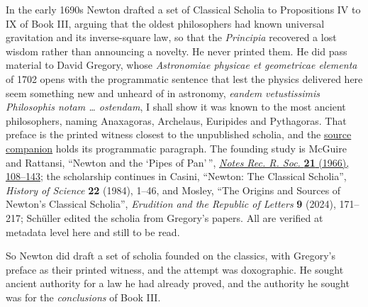 \documentclass[11pt,a4paper]{article}
\begin{document}
In the early 1690s Newton drafted a set of Classical Scholia to
Propositions IV to IX of Book III, arguing that the oldest philosophers
had known universal gravitation and its inverse-square law, so that the
\emph{Principia} recovered a lost wisdom rather than announcing a
novelty. He never printed them. He did pass material to David Gregory,
whose \emph{Astronomiae physicae et geometricae elementa} of 1702 opens
with the programmatic sentence that lest the physics delivered here seem
something new and unheard of in astronomy, \emph{eandem vetustissimis
Philosophis notam \ldots{} ostendam}, I shall show it was known to the
most ancient philosophers, naming Anaxagoras, Archelaus, Euripides and
Pythagoras. That preface is the printed witness closest to the
unpublished scholia, and the
\href{../docs/classics/Gregory_AstronomiaeElementa_Praefatio_1702_OCR.md}{source
companion} holds its programmatic paragraph. The founding study is
McGuire and Rattansi, ``Newton and the `Pipes of Pan'\,'',
\href{https://doi.org/10.1098/rsnr.1966.0014}{\emph{Notes Rec. R. Soc.}
\textbf{21} (1966), 108--143}; the scholarship continues in Casini,
``Newton: The Classical Scholia'', \emph{History of Science} \textbf{22}
(1984), 1--46, and Mosley, ``The Origins and Sources of Newton's
Classical Scholia'', \emph{Erudition and the Republic of Letters}
\textbf{9} (2024), 171--217; Schüller edited the scholia from Gregory's
papers. All are verified at metadata level here and still to be read.

So Newton did draft a set of scholia founded on the classics, with
Gregory's preface as their printed witness, and the attempt was
doxographic. He sought ancient authority for a law he had already
proved, and the authority he sought was for the \emph{conclusions} of
Book III.
\end{document}
